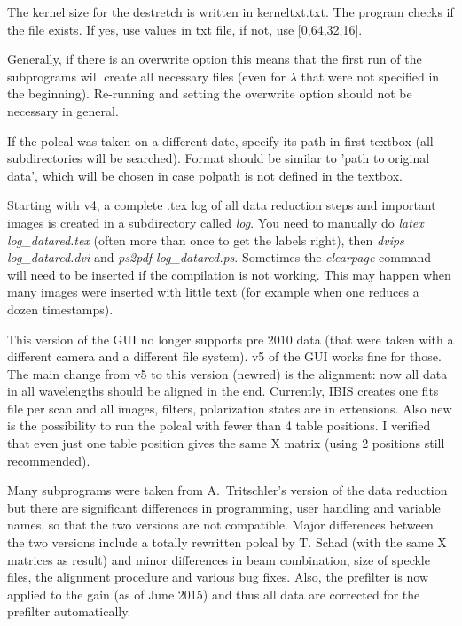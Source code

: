 \documentclass[a4paper,12pt]{article}
\begin{document}
The kernel size for the destretch is written in kerneltxt.txt. The program checks if
the file exists. If yes, use values in txt file, if not, use [0,64,32,16].

Generally, if there is an overwrite option this means that the first
run of the subprograms will create all necessary files (even for $\lambda$
that were not specified in the beginning). Re-running and setting the
overwrite option should not be necessary in general.

If the polcal was taken on a different date, specify its path in first
textbox (all subdirectories will be searched). Format should be
similar to 'path to original data', which will be chosen in case
polpath is not defined in the textbox.

Starting with v4, a complete .tex log of all data reduction steps and
important images is created in a subdirectory called \textit{log}. You
need to manually do \textit{latex log\_datared.tex} (often more than
once to get the labels right), then \textit{dvips log\_datared.dvi}
and \textit{ps2pdf log\_datared.ps}. Sometimes the \textit{clearpage}
command will need to be inserted if the compilation is not working. This may happen when many images were inserted with little text (for example when one reduces a dozen timestamps).

This version of the GUI no longer supports pre 2010 data (that were
taken with a different camera and a different file system). v5 of the
GUI works fine for those. The main change from v5 to this version (newred) is
the alignment: now all data in all wavelengths should be aligned in
the end. Currently, IBIS creates one fits file per scan and all
images, filters, polarization states are in extensions. Also new is
the possibility to run the polcal with fewer than 4 table positions. I
verified that even just one table position gives the same X matrix
(using 2 positions still recommended).

Many subprograms were taken from A.~Tritschler's version of the data reduction but there are significant differences in programming, user handling and variable names, so that the two versions are not compatible. Major differences between the two versions include a totally rewritten polcal by T. Schad (with the same X matrices as result) and minor differences in beam combination, size of speckle files, the alignment procedure and various bug fixes. Also, the prefilter is now applied to the gain (as of June 2015) and thus all data are corrected for the prefilter automatically.
\end{document}

